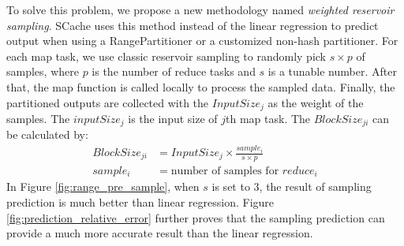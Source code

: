 {To solve this problem, we propose a new methodology named \textit{weighted reservoir sampling}.
SCache uses this method instead of the linear regression to predict output when using a RangePartitioner or a customized non-hash partitioner.
For each map task, we use classic reservoir sampling to randomly pick $s \times p$ of samples, where $p$ is the number of reduce tasks and $s$ is a tunable number. 
After that, the map function is called locally to process the sampled data. 
Finally, the partitioned outputs are collected with the $InputSize_j$ as the weight of the samples.
The $inputSize_j$ is the input size of $j$th map task. 
The $BlockSize_{ji}$ can be calculated by:
\begin{equation}
\label{equationsample}
\begin{aligned}
	BlockSize_{ji} &= {{InputSize_j \times \frac{sample_i}{s \times p}}} \\
	sample_i &= \text{number of samples for $reduce_i$}
\end{aligned}
\end{equation}
In Figure \ref{fig:range_pre_sample}, when $s$ is set to $3$, the result of sampling prediction is much better than linear regression. 
Figure \ref{fig:prediction_relative_error} further proves that the sampling prediction can provide a much more accurate result than the linear regression. 


}
